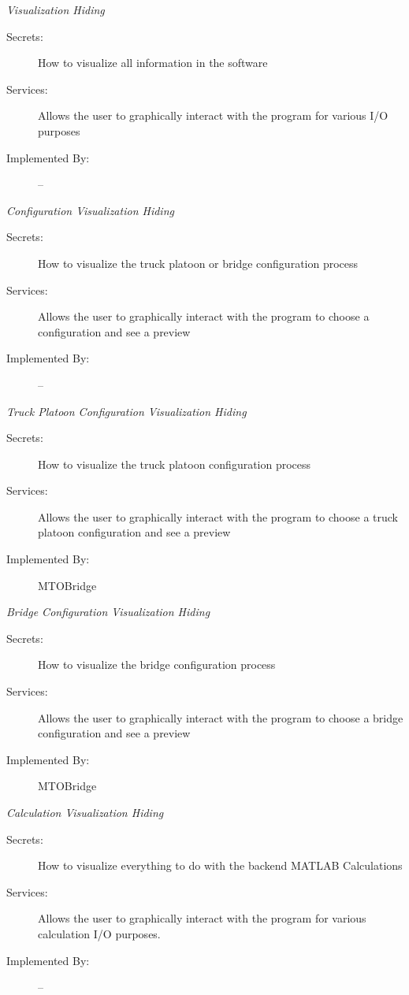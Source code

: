 \documentclass[12pt, titlepage]{article}
\begin{document}
     \hypertarget{VH}{\emph{{\large Visualization Hiding}}}
    \begin{description}
        \item[Secrets:]How to visualize all information in the software
        \item[Services:]Allows the user to graphically interact with the program for various I/O purposes
        \item[Implemented By:] --\\
    \end{description}
     \hypertarget{CVH}{\emph{{\large Configuration Visualization Hiding}}}
    \begin{description}
        \item[Secrets:]How to visualize the truck platoon or bridge configuration process
        \item[Services:]Allows the user to graphically interact with the program to choose a configuration and see a preview
        \item[Implemented By:] --\\
    \end{description}
     \hypertarget{TPCVH}{\emph{{\large Truck Platoon Configuration Visualization Hiding}}}
    \begin{description}
        \item[Secrets:]How to visualize the truck platoon configuration process
        \item[Services:]Allows the user to graphically interact with the program to choose a truck platoon configuration and see a preview
        \item[Implemented By:] MTOBridge\\
    \end{description}
     \hypertarget{BCVH}{\emph{{\large Bridge Configuration Visualization Hiding}}}
    \begin{description}
        \item[Secrets:]How to visualize the bridge configuration process
        \item[Services:]Allows the user to graphically interact with the program to choose a bridge configuration and see a preview
        \item[Implemented By:] MTOBridge\\
    \end{description}
     \hypertarget{CVH}{\emph{{\large Calculation Visualization Hiding}}}
    \begin{description}
        \item[Secrets:]How to visualize everything to do with the backend MATLAB Calculations
        \item[Services:]Allows the user to graphically interact with the program for various calculation I/O purposes.
        \item[Implemented By:] --\\
    \end{description}
\end{document}
